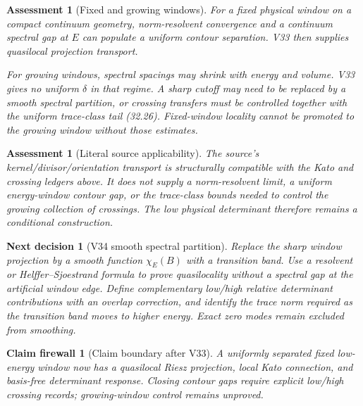 \documentclass[11pt]{article}
\newtheorem{firewall}[theorem]{Claim firewall}
\newtheorem{decision}[theorem]{Next decision}
\newtheorem{assessment}[theorem]{Assessment}
\theoremstyle{remark}
\begin{document}
\begin{assessment}[Fixed and growing windows]
\label{ass:v15v33-windows}
For a fixed physical window on a compact continuum geometry,
norm-resolvent convergence and a continuum spectral gap at \(E\)
can populate a uniform contour separation.  V33 then supplies
quasilocal projection transport.

For growing windows, spectral spacings may shrink with energy and
volume.  V33 gives no uniform \(\delta\) in that regime.  A sharp
cutoff may need to be replaced by a smooth spectral partition, or
crossing transfers must be controlled together with the uniform
trace-class tail (32.26).  Fixed-window locality cannot be promoted
to the growing window without those estimates.
\end{assessment}

\begin{assessment}[Literal source applicability]
\label{ass:v15v33-source}
The source's kernel/divisor/orientation transport is structurally
compatible with the Kato and crossing ledgers above.  It does not
supply a norm-resolvent limit, a uniform energy-window contour gap,
or the trace-class bounds needed to control the growing collection
of crossings.  The low physical determinant therefore remains a
conditional construction.
\end{assessment}

\begin{decision}[V34 smooth spectral partition]
\label{dec:v15v33-next}
Replace the sharp window projection by a smooth function
\(\chi_E(B)\) with a transition band.  Use a resolvent or
Helffer--Sjoestrand formula to prove quasilocality without a spectral
gap at the artificial window edge.  Define complementary low/high
relative determinant contributions with an overlap correction, and
identify the trace norm required as the transition band moves to
higher energy.  Exact zero modes remain excluded from smoothing.
\end{decision}

\begin{firewall}[Claim boundary after V33]
\label{fire:v15v33}
A uniformly separated fixed low-energy window now has a quasilocal
Riesz projection, local Kato connection, and basis-free determinant
response.  Closing contour gaps require explicit low/high crossing
records; growing-window control remains unproved.
\end{firewall}
\end{document}
